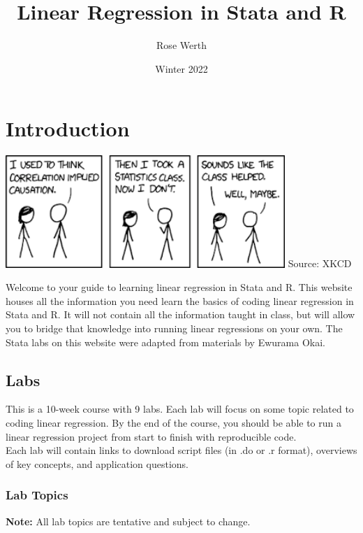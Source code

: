 \documentclass[
]{book}
\title{Linear Regression in Stata and R}
\author{Rose Werth}
\date{Winter 2022}
\begin{document}
\maketitle

{
\setcounter{tocdepth}{1}
\tableofcontents
}
\hypertarget{introduction}{%
\chapter{Introduction}\label{introduction}}

\includegraphics[width=4.16667in,height=\textheight]{images/causationcartoon.png}
Source: XKCD

Welcome to your guide to learning linear regression in Stata and R. This website houses all the information you need learn the basics of coding linear regression in Stata and R. It will not contain all the information taught in class, but will allow you to bridge that knowledge into running linear regressions on your own.
The Stata labs on this website were adapted from materials by Ewurama Okai.

\hypertarget{labs}{%
\section{Labs}\label{labs}}

This is a 10-week course with 9 labs. Each lab will focus on some topic related to coding linear regression. By the end of the course, you should be able to run a linear regression project from start to finish with reproducible code.\\
Each lab will contain links to download script files (in .do or .r format), overviews of key concepts, and application questions.

\hypertarget{lab-topics}{%
\subsection*{Lab Topics}\label{lab-topics}}

\textbf{Note:} All lab topics are tentative and subject to change.
\end{document}
